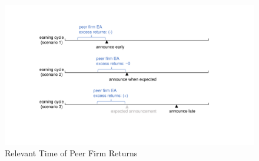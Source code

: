 \begin{figure}[h]
    \caption{Relevant Time of Peer Firm Returns} \label{fig:Peer_Firm_Timing}
    \includegraphics[width=\linewidth]{Figures/Hypothesis Graphs.pdf}  
\end{figure}